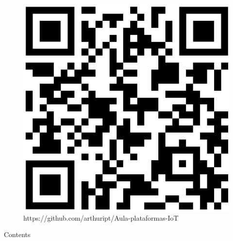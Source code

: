 \documentclass[aspectratio=169,xcolor=dvipsnames]{beamer}
\begin{document}
\begin{frame}[plain]
  \titlepage
\end{frame}

\begin{frame}[plain]

\begin{figure}
    \centering
    \includegraphics[width=0.5\linewidth]{QR-code-aula-mestrado.png}
    \caption{https://github.com/arthuript/Aula-plataformas-IoT}
\end{figure}
\end{frame}


\begin{frame}[plain]{Contents}
  \tableofcontents
\end{frame}
\end{document}
